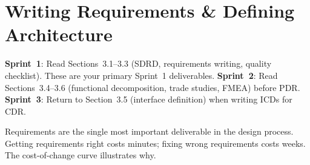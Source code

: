 \documentclass[11pt,letterpaper,twoside,openany]{book}
\begin{document}
\chapter{Writing Requirements \& Defining Architecture}\label{ch:requirements}

\begin{tipbox}
\textbf{Sprint~1}: Read Sections~3.1--3.3 (SDRD, requirements writing, quality checklist). These are your primary Sprint~1 deliverables. \textbf{Sprint~2}: Read Sections~3.4--3.6 (functional decomposition, trade studies, FMEA) before PDR. \textbf{Sprint~3}: Return to Section~3.5 (interface definition) when writing ICDs for CDR.
\end{tipbox}

\vspace{1em}

Requirements are the single most important deliverable in the design process. Getting requirements right costs minutes; fixing wrong requirements costs weeks. The cost-of-change curve illustrates why.
\end{document}
